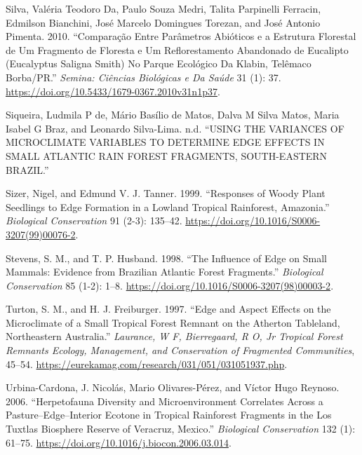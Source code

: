 \documentclass[
  12pt,
]{article}
\newlength{\cslhangindent}
\newenvironment{CSLReferences}[2] %
 {\begin{list}{}{%
  \setlength{\itemindent}{0pt}
  \setlength{\leftmargin}{0pt}
  \setlength{\parsep}{0pt}
  \ifodd #1
   \setlength{\leftmargin}{\cslhangindent}
   \setlength{\itemindent}{-1\cslhangindent}
  \fi
  \setlength{\itemsep}{#2\baselineskip}}}
 {\end{list}}
\begin{document}
\begin{CSLReferences}{1}{0}
Silva, Valéria Teodoro Da, Paulo Souza Medri, Talita Parpinelli
Ferracin, Edmilson Bianchini, José Marcelo Domingues Torezan, and José
Antonio Pimenta. 2010. {``Comparação Entre Parâmetros Abióticos e a
Estrutura Florestal de Um Fragmento de Floresta e Um Reflorestamento
Abandonado de Eucalipto ({Eucalyptus} Saligna {Smith}) No Parque
Ecológico Da {Klabin}, {Telêmaco} {Borba}/{PR}.''} \emph{Semina:
Ciências Biológicas e Da Saúde} 31 (1): 37.
\url{https://doi.org/10.5433/1679-0367.2010v31n1p37}.

Siqueira, Ludmila P de, Mário Basílio de Matos, Dalva M Silva Matos,
Maria Isabel G Braz, and Leonardo Silva-Lima. n.d. {``{USING} {THE}
{VARIANCES} {OF} {MICROCLIMATE} {VARIABLES} {TO} {DETERMINE} {EDGE}
{EFFECTS} {IN} {SMALL} {ATLANTIC} {RAIN} {FOREST} {FRAGMENTS},
{SOUTH}-{EASTERN} {BRAZIL}.''}

Sizer, Nigel, and Edmund V. J. Tanner. 1999. {``Responses of Woody Plant
Seedlings to Edge Formation in a Lowland Tropical Rainforest,
{Amazonia}.''} \emph{Biological Conservation} 91 (2-3): 135--42.
\url{https://doi.org/10.1016/S0006-3207(99)00076-2}.

Stevens, S. M., and T. P. Husband. 1998. {``The Influence of Edge on
Small Mammals: Evidence from {Brazilian} {Atlantic} Forest Fragments.''}
\emph{Biological Conservation} 85 (1-2): 1--8.
\url{https://doi.org/10.1016/S0006-3207(98)00003-2}.

Turton, S. M., and H. J. Freiburger. 1997. {``Edge and Aspect Effects on
the Microclimate of a Small Tropical Forest Remnant on the {Atherton}
{Tableland}, Northeastern {Australia}.''} \emph{Laurance, W F,
Bierregaard, R O, Jr Tropical Forest Remnants Ecology, Management, and
Conservation of Fragmented Communities}, 45--54.
\url{https://eurekamag.com/research/031/051/031051937.php}.

Urbina-Cardona, J. Nicolás, Mario Olivares-Pérez, and Víctor Hugo
Reynoso. 2006. {``Herpetofauna Diversity and Microenvironment Correlates
Across a Pasture--Edge--Interior Ecotone in Tropical Rainforest
Fragments in the {Los} {Tuxtlas} {Biosphere} {Reserve} of {Veracruz},
{Mexico}.''} \emph{Biological Conservation} 132 (1): 61--75.
\url{https://doi.org/10.1016/j.biocon.2006.03.014}.


\end{CSLReferences}
\end{document}

